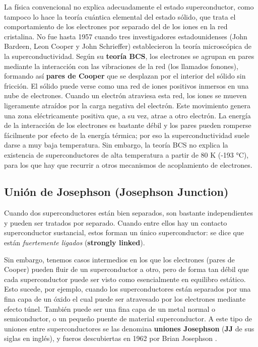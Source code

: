 La física convencional no explica adecuadamente el estado superconductor, como tampoco lo hace la teoría cuántica elemental del estado sólido, que trata el comportamiento de los electrones por separado del de los iones en la red cristalina. No fue hasta 1957 cuando tres investigadores estadounidenses (John Bardeen, Leon Cooper y John Schrieffer) establecieron la teoría microscópica de la superconductividad.  Según su \textbf{teoría BCS}, los electrones se agrupan en pares mediante la interacción con las vibraciones de la red (los llamados fonones), formando así \textbf{pares de Cooper} que se desplazan por el interior del sólido sin fricción. El sólido puede verse como una red de iones positivos inmersos en una nube de electrones. Cuando un electrón atraviesa esta red, los iones se mueven ligeramente atraídos por la carga negativa del electrón. Este movimiento genera una zona eléctricamente positiva que, a su vez, atrae a otro electrón. La energía de la interacción de los electrones es bastante débil y los pares pueden romperse fácilmente por efecto de la energía térmica; por eso la superconductividad suele darse a muy baja temperatura. Sin embargo, la teoría BCS no explica la existencia de superconductores de alta temperatura a partir de 80 K (-193 °C), para los que hay que recurrir a otros mecanismos de acoplamiento de electrones.



\subsection{Unión de Josephson (Josephson Junction)}

Cuando dos superconductores están bien separados, son bastante independientes y pueden ser tratados por separado. Cuando entre ellos hay un contacto superconductor sustancial, estos forman un único superconductor: se dice que están \textit{fuertemente ligados} (\textbf{strongly linked}). 

Sin embargo, tenemos casos intermedios en los que los electrones (pares de Cooper) pueden fluir de un superconductor a otro, pero de forma tan débil que cada superconductor puede ser visto como esencialmente en equilibro estático. Esto sucede, por ejemplo, cuando los superconductores están separados por una fina capa de un óxido el cual puede ser atravesado por los electrones mediante efecto túnel. También puede ser una fina capa de un metal normal o semiconductor, o un pequeño puente de material superconductor. A este tipo de uniones entre superconductores se las denomina \textbf{uniones Josephson} (\textbf{JJ} de sus siglas en inglés), y fueros descubiertas en 1962 por Brian Josephson \cite{bib_Josephson_1962}.

